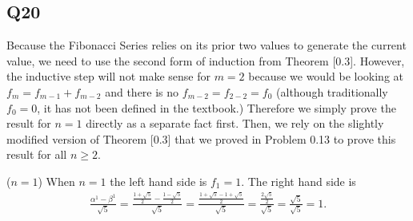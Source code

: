 \documentclass[12pt]{article}
\numberwithin{theorem}{section}
\numberwithin{equation}{section}
\numberwithin{remark}{section}
\numberwithin{definition}{section}
\numberwithin{theorem}{section}
\numberwithin{lemma}{section}
\numberwithin{example}{section}
\begin{document}
\subsection{Q20}

Because the Fibonacci Series relies on its prior two values to generate the current value, we need to use the second form of induction from Theorem [0.3]. However, the inductive step will not make sense for $m=2$ because we would be looking at $f_m = f_{m-1} + f_{m-2}$ and there is no $f_{m-2}=f_{2-2}=f_0$ (although traditionally $f_0=0$, it has not been defined in the textbook.) Therefore we simply prove the result for $n=1$ directly as a separate fact first. Then, we rely on the slightly modified version of Theorem [0.3] that we proved in Problem 0.13 to prove this result for all $n\ge2$.

\vspace{\baselineskip}

\noindent ($n=1$) When $n=1$ the left hand side is $f_1 = 1$. The right hand side is
\begin{align*}
	\frac{\alpha^1-\beta^1}{\sqrt{5}}=\frac{\frac{1+\sqrt{5}}{2}-\frac{1-\sqrt{5}}{2}}{\sqrt{5}}=\frac{\frac{1+\sqrt{5}-1+\sqrt{5}}{2}}{\sqrt{5}}=\frac{\frac{2\sqrt{5}}{2}}{\sqrt{5}}=\frac{\sqrt{5}}{\sqrt{5}}=1.
\end{align*}

\vspace{\baselineskip}
\end{document}
